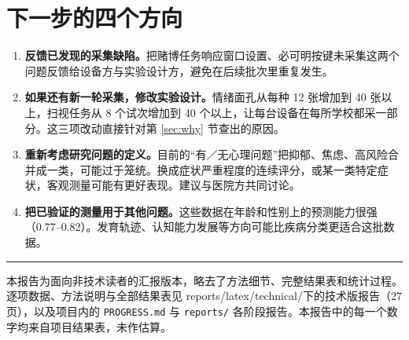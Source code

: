 \documentclass[UTF8,12pt,a4paper]{ctexart}
\newcommand{\ubrk}{\textunderscore\allowbreak}
\newcommand{\fname}[1]{{\ttfamily\let\_\ubrk #1}}
\newcommand{\key}[1]{\textbf{\textcolor{blue!45!black}{#1}}}
\begin{document}
\section{下一步的四个方向}\label{sec:next}

\begin{enumerate}
\item \key{反馈已发现的采集缺陷。}把赌博任务响应窗口设置、必可明按键未采集这两个问题反馈给设备方与实验设计方，避免在后续批次里重复发生。

\item \key{如果还有新一轮采集，修改实验设计。}情绪面孔从每种 12 张增加到 40 张以上，扫视任务从 8 个试次增加到 40 个以上，让每台设备在每所学校都采一部分。这三项改动直接针对第 \ref{sec:why} 节查出的原因。

\item \key{重新考虑研究问题的定义。}目前的“有／无心理问题”把抑郁、焦虑、高风险合并成一类，可能过于笼统。换成症状严重程度的连续评分，或某一类特定症状，客观测量可能有更好表现。建议与医院方共同讨论。

\item \key{把已验证的测量用于其他问题。}这些数据在年龄和性别上的预测能力很强（0.77--0.82）。发育轨迹、认知能力发展等方向可能比疾病分类更适合这批数据。
\end{enumerate}

\vspace{1em}
\noindent\rule{\textwidth}{0.4pt}
\vspace{0.4em}

\noindent\small 本报告为面向非技术读者的汇报版本，略去了方法细节、完整结果表和统计过程。逐项数据、方法说明与全部结果表见 \fname{reports/latex/technical/}下的技术版报告（27 页），以及项目内的 \texttt{PROGRESS.md} 与 \texttt{reports/} 各阶段报告。本报告中的每一个数字均来自项目结果表，未作估算。
\end{document}
